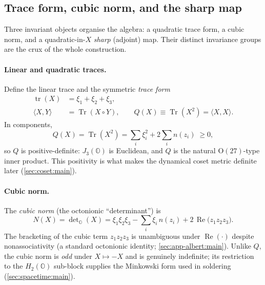 \documentclass[11pt]{article}
\theoremstyle{plain}
\theoremstyle{definition}
\theoremstyle{remark}
\begin{document}
\subsection{Trace form, cubic norm, and the sharp map}
\label{sec:albert:invariants}

Three invariant objects organise the algebra: a quadratic trace form, a
cubic norm, and a quadratic-in-$X$ \emph{sharp} (adjoint) map. Their
distinct invariance groups are the crux of the whole construction.

\paragraph{Linear and quadratic traces.}
Define the linear trace and the symmetric \emph{trace form}
\begin{align}
  \operatorname{tr}(X) &= \xi_{1}+\xi_{2}+\xi_{3},
  \label{eq:albert:lintrace}\\[2pt]
  \langle X,Y\rangle &= \operatorname{Tr}(X\circ Y),
  \qquad
  Q(X)\equiv \operatorname{Tr}(X^{2})=\langle X,X\rangle .
  \label{eq:albert:traceform}
\end{align}
In components,
\begin{equation}\label{eq:albert:Qcomp}
  Q(X)=\operatorname{Tr}(X^{2})
  =\sum_{i}\xi_{i}^{2}+2\sum_{i} n(z_{i}) \;\ge 0 ,
\end{equation}
so $Q$ is positive-definite: $J_{3}(\mathbb{O})$ is Euclidean, and $Q$ is
the natural $\mathrm{O}(27)$-type inner product. This positivity is what
makes the dynamical coset metric definite later
(\autoref{sec:coset:main}).

\paragraph{Cubic norm.}
The \emph{cubic norm} (the octonionic ``determinant'') is
\begin{equation}\label{eq:albert:Ndef}
  N(X)=\det\nolimits_{\mathbb{O}}(X)
  =\xi_{1}\xi_{2}\xi_{3}
   -\sum_{i}\xi_{i}\,n(z_{i})
   +2\,\operatorname{Re}\!\bigl(z_{1}z_{2}z_{3}\bigr).
\end{equation}
The bracketing of the cubic term $z_{1}z_{2}z_{3}$ is unambiguous under
$\operatorname{Re}(\cdot)$ despite nonassociativity (a standard
octonionic identity; \autoref{sec:app-albert:main}). Unlike $Q$, the cubic
norm is \emph{odd} under $X\mapsto -X$ and is genuinely indefinite; its
restriction to the $H_{2}(\mathbb{O})$ sub-block supplies the Minkowski
form used in soldering (\autoref{sec:spacetime:main}).
\end{document}
